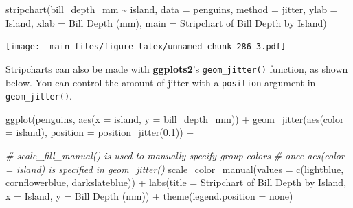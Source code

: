 \documentclass[
]{book}
\newenvironment{Shaded}{\begin{snugshade}}{\end{snugshade}}
\newcommand{\AttributeTok}[1]{\textcolor[rgb]{0.77,0.63,0.00}{#1}}
\newcommand{\CommentTok}[1]{\textcolor[rgb]{0.56,0.35,0.01}{\textit{#1}}}
\newcommand{\FloatTok}[1]{\textcolor[rgb]{0.00,0.00,0.81}{#1}}
\newcommand{\FunctionTok}[1]{\textcolor[rgb]{0.00,0.00,0.00}{#1}}
\newcommand{\NormalTok}[1]{#1}
\newcommand{\SpecialCharTok}[1]{\textcolor[rgb]{0.00,0.00,0.00}{#1}}
\newcommand{\StringTok}[1]{\textcolor[rgb]{0.31,0.60,0.02}{#1}}
\begin{document}
\begin{Shaded}
\begin{Highlighting}[]
\FunctionTok{stripchart}\NormalTok{(bill\_depth\_mm }\SpecialCharTok{\textasciitilde{}}\NormalTok{ island, }\AttributeTok{data =}\NormalTok{ penguins, }
           \AttributeTok{method =} \StringTok{\textquotesingle{}jitter\textquotesingle{}}\NormalTok{,}
           \AttributeTok{ylab =} \StringTok{\textquotesingle{}Island\textquotesingle{}}\NormalTok{, }\AttributeTok{xlab =} \StringTok{\textquotesingle{}Bill Depth (mm)\textquotesingle{}}\NormalTok{, }
           \AttributeTok{main =} \StringTok{\textquotesingle{}Stripchart of Bill Depth by Island\textquotesingle{}}\NormalTok{)}
\end{Highlighting}
\end{Shaded}

\texttt{[image: \_main\_files/figure-latex/unnamed-chunk-286-3.pdf]}

Stripcharts can also be made with \textbf{ggplots2}'s \texttt{geom\_jitter()} function, as shown below. You can control the amount of jitter with a \texttt{position} argument in \texttt{geom\_jitter()}.

\begin{Shaded}
\begin{Highlighting}[]
\FunctionTok{ggplot}\NormalTok{(penguins, }\FunctionTok{aes}\NormalTok{(}\AttributeTok{x =}\NormalTok{ island, }\AttributeTok{y =}\NormalTok{ bill\_depth\_mm)) }\SpecialCharTok{+}
  \FunctionTok{geom\_jitter}\NormalTok{(}\FunctionTok{aes}\NormalTok{(}\AttributeTok{color =}\NormalTok{ island), }\AttributeTok{position =} \FunctionTok{position\_jitter}\NormalTok{(}\FloatTok{0.1}\NormalTok{)) }\SpecialCharTok{+}
  
  \CommentTok{\# scale\_fill\_manual() is used to manually specify group colors }
  \CommentTok{\# once aes(color = island) is specified in \textasciigrave{}geom\_jitter()\textasciigrave{}}
  \FunctionTok{scale\_color\_manual}\NormalTok{(}\AttributeTok{values =} \FunctionTok{c}\NormalTok{(}\StringTok{\textquotesingle{}lightblue\textquotesingle{}}\NormalTok{, }\StringTok{\textquotesingle{}cornflowerblue\textquotesingle{}}\NormalTok{, }\StringTok{\textquotesingle{}darkslateblue\textquotesingle{}}\NormalTok{)) }\SpecialCharTok{+} 
  \FunctionTok{labs}\NormalTok{(}\AttributeTok{title =} \StringTok{\textquotesingle{}Stripchart of Bill Depth by Island\textquotesingle{}}\NormalTok{, }
       \AttributeTok{x =} \StringTok{\textquotesingle{}Island\textquotesingle{}}\NormalTok{, }\AttributeTok{y =} \StringTok{\textquotesingle{}Bill Depth (mm)\textquotesingle{}}\NormalTok{) }\SpecialCharTok{+}
  \FunctionTok{theme}\NormalTok{(}\AttributeTok{legend.position =} \StringTok{\textquotesingle{}none\textquotesingle{}}\NormalTok{)}
\end{Highlighting}
\end{Shaded}
\end{document}
